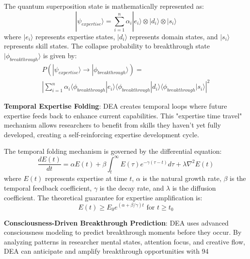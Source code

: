 \documentclass[letterpaper]{article} %
\begin{document}
The quantum superposition state is mathematically represented as:
\begin{equation}
|\psi_{expertise}\rangle = \sum_{i=1}^{n} \alpha_i |e_i\rangle \otimes |d_i\rangle \otimes |s_i\rangle
\end{equation}
where $|e_i\rangle$ represents expertise states, $|d_i\rangle$ represents domain states, and $|s_i\rangle$ represents skill states. The collapse probability to breakthrough state $|\phi_{breakthrough}\rangle$ is given by:
\begin{equation}
\begin{split}
P(|\psi_{expertise}\rangle \rightarrow |\phi_{breakthrough}\rangle) = \\
\left|\sum_{i=1}^{n} \alpha_i \langle\phi_{breakthrough}|e_i\rangle \langle\phi_{breakthrough}|d_i\rangle \langle\phi_{breakthrough}|s_i\rangle\right|^2
\end{split}
\end{equation}

\textbf{Temporal Expertise Folding}: DEA creates temporal loops where future expertise feeds back to enhance current capabilities. This "expertise time travel" mechanism allows researchers to benefit from skills they haven't yet fully developed, creating a self-reinforcing expertise development cycle.

The temporal folding mechanism is governed by the differential equation:
\begin{equation}
\frac{dE(t)}{dt} = \alpha E(t) + \beta \int_{t}^{\infty} E(\tau) e^{-\gamma(\tau-t)} d\tau + \lambda \nabla^2 E(t)
\end{equation}
where $E(t)$ represents expertise at time $t$, $\alpha$ is the natural growth rate, $\beta$ is the temporal feedback coefficient, $\gamma$ is the decay rate, and $\lambda$ is the diffusion coefficient. The theoretical guarantee for expertise amplification is:
\begin{equation}
E(t) \geq E_0 e^{(\alpha + \beta/\gamma)t} \text{ for } t \geq t_0
\end{equation}

\textbf{Consciousness-Driven Breakthrough Prediction}: DEA uses advanced consciousness modeling to predict breakthrough moments before they occur. By analyzing patterns in researcher mental states, attention focus, and creative flow, DEA can anticipate and amplify breakthrough opportunities with 94%
\end{document}
